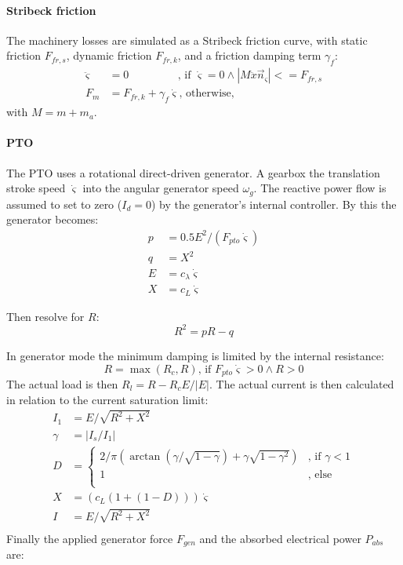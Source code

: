 \documentclass[oneside,10pt,a4paper]{book}
\begin{document}
\paragraph{Stribeck friction}
The machinery losses are simulated as a Stribeck friction curve, with static friction $F_{fr,s}$, dynamic friction $F_{fr,k}$, and a friction damping term $\gamma_f$:
\begin{align}
	\ddot{\varsigma}&=0\phantom{................} \text{, if }\dot{\varsigma}=0 \wedge |M\ddot{x}\vec{n}_{\varsigma}| <= F_{fr,s}\\
	F_{m}&=F_{fr,k}+\gamma_f \dot{\varsigma} \text{, otherwise,}
\end{align}
with $M=m+m_a$.
\paragraph{PTO}
The PTO uses a rotational direct-driven generator. A gearbox the translation stroke speed $\dot{\varsigma}$ into the angular generator speed $\omega_g$. The reactive power flow is assumed to set to zero ($I_d=0$) by the generator's internal controller. By this the generator becomes:
\begin{align}
	p&=0.5 E^2/(F_{pto} \dot{\varsigma})\\
	q&=X^2\\
	E&=c_\lambda \dot{\varsigma}\\
	X&=c_L\dot{\varsigma}
\end{align}


Then resolve for $R$:
\begin{equation}
	R^2=p R-q
\end{equation}

In generator mode the minimum damping is limited by the internal resistance:
\begin{equation}
	R=\max(R_c,R)\text{, if }F_{pto}\dot{\varsigma}>0 \wedge R>0
\end{equation}
The actual load is then $R_l=R-R_c E/|E|$. The actual current is then calculated in relation to the current saturation limit:
\begin{align}
	I_1&=E/\sqrt{R^2+X^2}\\
	\gamma&=|I_s/I_1|\\
	D&=
	\begin{cases}
		2/\pi(\arctan(\gamma/\sqrt{1-\gamma})+\gamma \sqrt{1-\gamma^2})&\text{, if } \gamma<1\\	
		1&\text{, else}\\
	\end{cases}\\
	X&=(c_L (1+(1-D)))\dot{\varsigma}\\
	I&=E/\sqrt{R^2+X^2}\\
\end{align}
Finally the applied generator force $F_{gen}$ and the absorbed electrical power $P_{abs}$ are:
\end{document}
